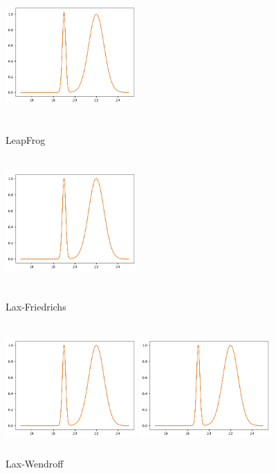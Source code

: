 \documentclass{ctexart}
\begin{document}
\begin{figure}[htbp]
	\begin{minipage}{5cm}
		\centering
		\includegraphics[width = 5cm, height = 5cm]{3-6.png}
		\caption{LeapFrog}
		\label{adv6}
	\end{minipage}
	\begin{minipage}{5cm}
		\centering
		\includegraphics[width = 5cm, height = 5cm]{3-7.png}
		\caption{Lax-Friedrichs}
		\label{adv7}
	\end{minipage}
	\begin{minipage}{5cm}
		\centering
		\includegraphics[width = 5cm, height = 5cm]{3-8.png}
		\caption{Lax-Wendroff}
		\label{adv8}
	\end{minipage}
	\begin{minipage}{5cm}
		\centering
		\includegraphics[width = 5cm, height = 5cm]{3-9.png}

\end{minipage}
\end{figure}
\end{document}
